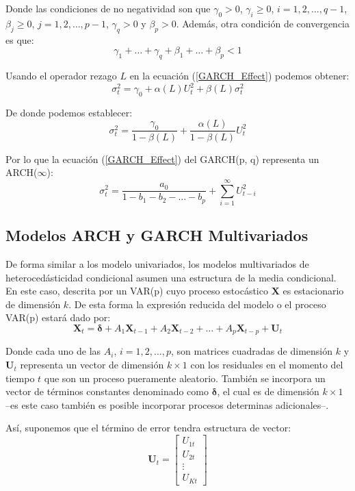 \documentclass[
  a4paper,
]{article}
\begin{document}
Donde las condiciones de no negatividad son que \(\gamma_0 > 0\),
\(\gamma_i \geq 0\), \(i = 1, 2, \ldots, q-1\), \(\beta_j \geq 0\),
\(j = 1, 2, \ldots, p-1\), \(\gamma_q > 0\) y \(\beta_p > 0\). Además,
otra condición de convergencia es que: \begin{equation*}
    \gamma_1 + \ldots + \gamma_q + \beta_1 + \ldots + \beta_p < 1
\end{equation*}

Usando el operador rezago \(L\) en la ecuación (\ref{GARCH_Effect})
podemos obtener: \[
    \sigma^2_t = \gamma_0 + \alpha(L) U_t^2 + \beta(L) \sigma^2_t
    \label{GARCH_Effect_L}
\]

De donde podemos establecer: \[
    \sigma^2_t = \frac{\gamma_0}{1 - \beta(L)} + \frac{\alpha(L)}{1 - \beta(L)} U_t^2 
\]

Por lo que la ecuación (\ref{GARCH_Effect}) del GARCH(p, q) representa
un ARCH(\(\infty\)): \[
    \sigma^2_t = \frac{a_0}{1 - b_1 - b_2 - \ldots - b_p} + \sum_{i = 1}^\infty U_{t-i}^2 
\]

\subsection{Modelos ARCH y GARCH
Multivariados}\label{modelos-arch-y-garch-multivariados}

De forma similar a los modelo univariados, los modelos multivariados de
heterocedásticidad condicional asumen una estructura de la media
condicional. En este caso, descrita por un VAR(p) cuyo proceso
estocástico \(\mathbf{X}\) es estacionario de dimensión \(k\). De esta
forma la expresión reducida del modelo o el proceso VAR(p) estará dado
por: \[
    \mathbf{X}_t = \mathbf{\delta} + A_1 \mathbf{X}_{t-1} + A_2 \mathbf{X}_{t-2} + \ldots + A_p \mathbf{X}_{t-p} + \mathbf{U}_{t}
\]

Donde cada uno de las \(A_i\), \(i = 1, 2, \ldots, p\), son matrices
cuadradas de dimensión \(k\) y \(\mathbf{U}_t\) representa un vector de
dimensión \(k \times 1\) con los residuales en el momento del tiempo
\(t\) que son un proceso pueramente aleatorio. También se incorpora un
vector de términos constantes denominado como \(\mathbf{\delta}\), el
cual es de dimensión \(k \times 1\) --es este caso también es posible
incorporar procesos determinas adicionales--.

Así, suponemos que el término de error tendra estructura de vector:
\begin{equation*}
    \mathbf{U}_t = 
    \begin{bmatrix}
    U_{1t} \\ U_{2t} \\ \vdots \\ U_{Kt}
    \end{bmatrix}
\end{equation*}
\end{document}
